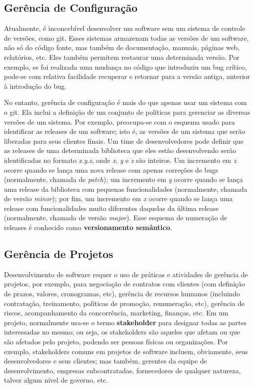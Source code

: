 \documentclass[
  11pt,
  twoside]{book}
\begin{document}
\hypertarget{geruxeancia-de-configurauxe7uxe3o}{%
\subsection{Gerência de
Configuração}\label{geruxeancia-de-configurauxe7uxe3o}}

 Atualmente, é inconcebível desenvolver
um software sem um sistema de controle de versões, como git. Esses
sistemas armazenam todas as versões de um software, não só do código
fonte, mas também de documentação, manuais, páginas web, relatórios,
etc. Eles também permitem restaurar uma determinada versão. Por exemplo,
se foi realizada uma mudança no código que introduziu um bug crítico,
pode-se com relativa facilidade recuperar e retornar para a versão
antiga, anterior à introdução do bug.

 No entanto, gerência de configuração é
mais do que apenas usar um sistema com o git. Ela inclui a definição de
um conjunto de políticas para gerenciar as diversas versões de um
sistema. Por exemplo, preocupa-se com o esquema usado para identificar
as releases de um software; isto é, as versões de um sistema que serão
liberadas para seus clientes finais. Um time de desenvolvedores pode
definir que as releases de uma determinada biblioteca que eles estão
desenvolvendo serão identificadas no formato \emph{x}.\emph{y}.\emph{z},
onde \emph{x}, \emph{y} e \emph{z} são inteiros. Um incremento em
\emph{z} ocorre quando se lança uma nova release com apenas correções de
bugs (normalmente, chamada de \emph{patch}); um incremento em \emph{y}
ocorre quando se lança uma release da biblioteca com pequenas
funcionalidades (normalmente, chamada de versão \emph{minor}); por fim,
um incremento em \emph{x} ocorre quando se lança uma release com
funcionalidades muito diferentes daquelas da última release
(normalmente, chamada de versão \emph{major}). Esse esquema de numeração
de releases é conhecido como \textbf{versionamento semântico}.

\hypertarget{geruxeancia-de-projetos}{%
\subsection{Gerência de Projetos}\label{geruxeancia-de-projetos}}

  Desenvolvimento de
software requer o uso de práticas e atividades de gerência de projetos,
por exemplo, para negociação de contratos com clientes (com definição de
prazos, valores, cronogramas, etc), gerência de recursos humanos
(incluindo contratação, treinamento, políticas de promoção, remuneração,
etc), gerência de riscos, acompanhamento da concorrência, marketing,
finanças, etc. Em um projeto, normalmente usa-se o termo
\textbf{stakeholder} para designar todas as partes interessadas no
mesmo; ou seja, os stakeholders são aqueles que afetam ou que são
afetados pelo projeto, podendo ser pessoas físicas ou organizações. Por
exemplo, stakeholders comuns em projetos de software incluem,
obviamente, seus desenvolvedores e seus clientes; mas também, gerentes
da equipe de desenvolvimento, empresas subcontratadas, fornecedores de
qualquer natureza, talvez algum nível de governo, etc.
\end{document}
